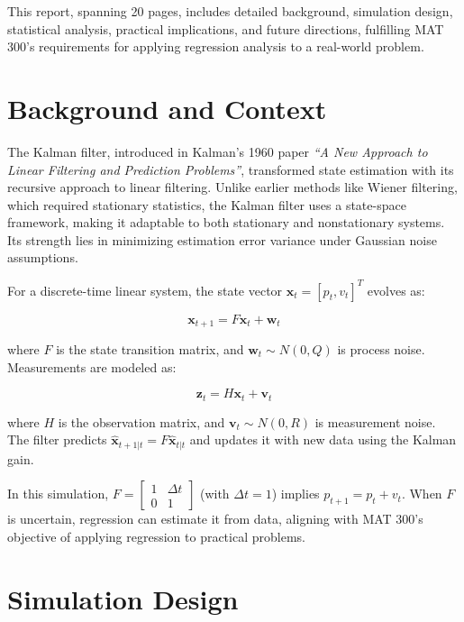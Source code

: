 \documentclass[12pt]{article}
\begin{document}
This report, spanning 20 pages, includes detailed background, simulation design, statistical analysis, practical implications, and future directions, fulfilling MAT 300’s requirements for applying regression analysis to a real-world problem.

\section{Background and Context}
\label{sec:background}

The Kalman filter, introduced in Kalman’s 1960 paper \textit{``A New Approach to Linear Filtering and Prediction Problems''}, transformed state estimation with its recursive approach to linear filtering. Unlike earlier methods like Wiener filtering, which required stationary statistics, the Kalman filter uses a state-space framework, making it adaptable to both stationary and nonstationary systems. Its strength lies in minimizing estimation error variance under Gaussian noise assumptions.

For a discrete-time linear system, the state vector \( \mathbf{x}_t = [p_t, v_t]^T \) evolves as:

\begin{equation}
    \mathbf{x}_{t+1} = F \mathbf{x}_t + \mathbf{w}_t
    \label{eq:state_transition}
\end{equation}

where \( F \) is the state transition matrix, and \( \mathbf{w}_t \sim N(0, Q) \) is process noise. Measurements are modeled as:

\begin{equation}
    \mathbf{z}_t = H \mathbf{x}_t + \mathbf{v}_t
    \label{eq:measurement}
\end{equation}

where \( H \) is the observation matrix, and \( \mathbf{v}_t \sim N(0, R) \) is measurement noise. The filter predicts \( \hat{\mathbf{x}}_{t+1|t} = F \hat{\mathbf{x}}_{t|t} \) and updates it with new data using the Kalman gain.

In this simulation, \( F = \begin{bmatrix} 1 & \Delta t \\ 0 & 1 \end{bmatrix} \) (with \( \Delta t = 1 \)) implies \( p_{t+1} = p_t + v_t \). When \( F \) is uncertain, regression can estimate it from data, aligning with MAT 300’s objective of applying regression to practical problems.

\section{Simulation Design}
\label{sec:simulation}
\end{document}
